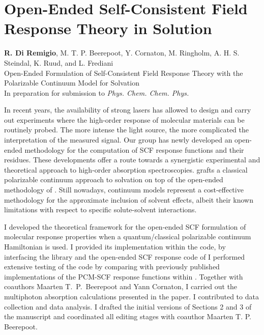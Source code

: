 \section{Open-Ended Self-Consistent Field Response Theory in
Solution}\label{sec:pcmopenrsp}

\begin{tcolorbox}
  {\small
  \textbf{R. Di Remigio}, M. T. P. Beerepoot, Y. Cornaton, M. Ringholm,
  A. H. S. Steindal, K. Ruud, and L. Frediani
  \\
  \textsf{
  Open-Ended Formulation of Self-Consistent Field Response Theory with
  the Polarizable Continuum Model for Solvation
  }
  \\
  In preparation for submission to \textit{Phys. Chem. Chem. Phys.}
  }
\end{tcolorbox}

In recent years, the availability of strong lasers has allowed to
design and carry out experiments where the high-order response of
molecular materials can be routinely probed.
The more intense the light source, the more complicated the interpretation of
the measured signal.
Our group has newly developed an open-ended methodology for the computation of
\acrshort{SCF} response functions\autocite{Thorvaldsen2008-sg, Ringholm2014-gx} and
their residues.\autocite{Friese2015-kb}
These developments offer a route towards a synergistic experimental and
theoretical approach to high-order absorption spectroscopies.
 grafts a classical polarizable continuum approach to solvation on top
of the open-ended methodology of \citeauthor{Thorvaldsen2008-sg}.
Still nowadays, continuum models represent a cost-effective methodology for the
approximate inclusion of solvent effects, albeit their known limitations with respect
to specific solute-solvent interactions.

I developed the theoretical framework for the open-ended \acrshort{SCF} formulation
of molecular response properties when a quantum/classical polarizable continuum
Hamiltonian is used.\autocite{Thorvaldsen2008-sg, Lipparini2010-be}
I provided its implementation within the \DALTON code, by interfacing the
\pcmsolver library and the open-ended \acrshort{SCF} response code of
\citeauthor{Ringholm2014-gx}\autocite{Ringholm2014-gx, Friese2015-kb}
I performed extensive testing of the code by comparing with previously
published implementations of the \acrshort{PCM}-\acrshort{SCF} response functions within
\DALTON.\autocite{Cammi2003-qy, Frediani2005-nc, Ferrighi2010-pm}
Together with coauthors Maarten T.~P.~Beerepoot and Yann Cornaton, I carried out
the multiphoton absorption calculations presented in the paper. I contributed
to data collection and data analysis.
I drafted the initial versions of Sections 2 and 3 of the manuscript and coordinated all
editing stages with coauthor Maarten T. P. Beerepoot.
